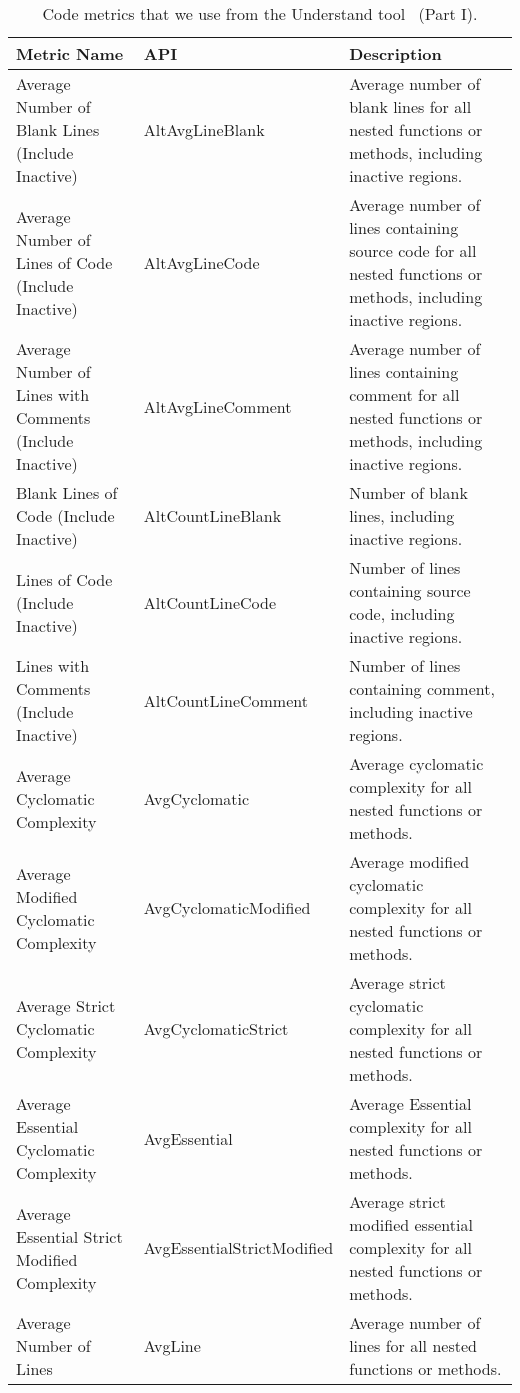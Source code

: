 \begin{table}
	\centering
	\scriptsize
	\caption{Code metrics that we use from the Understand tool~\cite{understand} (Part I).\label{table:code_metrics1}}
	\begin{tabular}{p{}p{}p{}}
		\hline
		{\bfseries Metric Name} & {\bfseries API} & {\bfseries Description}\\
		\hline
		Average Number of Blank Lines (Include Inactive) & AltAvgLineBlank & Average number of blank lines for all nested functions or methods, including inactive regions.\\
		Average Number of Lines of Code (Include Inactive) & AltAvgLineCode & Average number of lines containing source code for all nested functions or methods, including inactive regions.\\
		Average Number of Lines with Comments (Include Inactive) & AltAvgLineComment & Average number of lines containing comment for all nested functions or methods, including inactive regions.\\
		Blank Lines of Code (Include Inactive) & AltCountLineBlank & Number of blank lines, including inactive regions.\\
		Lines of Code (Include Inactive) & AltCountLineCode & Number of lines containing source code, including inactive regions.\\
		Lines with Comments (Include Inactive) & AltCountLineComment & Number of lines containing comment, including inactive regions.\\
		Average Cyclomatic Complexity & AvgCyclomatic & Average cyclomatic complexity for all nested functions or methods.\\
		Average Modified Cyclomatic Complexity & AvgCyclomaticModified & Average modified cyclomatic complexity for all nested functions or methods.\\
		Average Strict Cyclomatic Complexity & AvgCyclomaticStrict & Average strict cyclomatic complexity for all nested functions or methods.\\
		Average Essential Cyclomatic Complexity & AvgEssential & Average Essential complexity for all nested functions or methods.\\
		Average Essential Strict Modified Complexity & AvgEssentialStrictModified & Average strict modified essential complexity for all nested functions or methods.\\
		Average Number of Lines & AvgLine & Average number of lines for all nested functions or methods.\\

\end{tabular}
\end{table}
